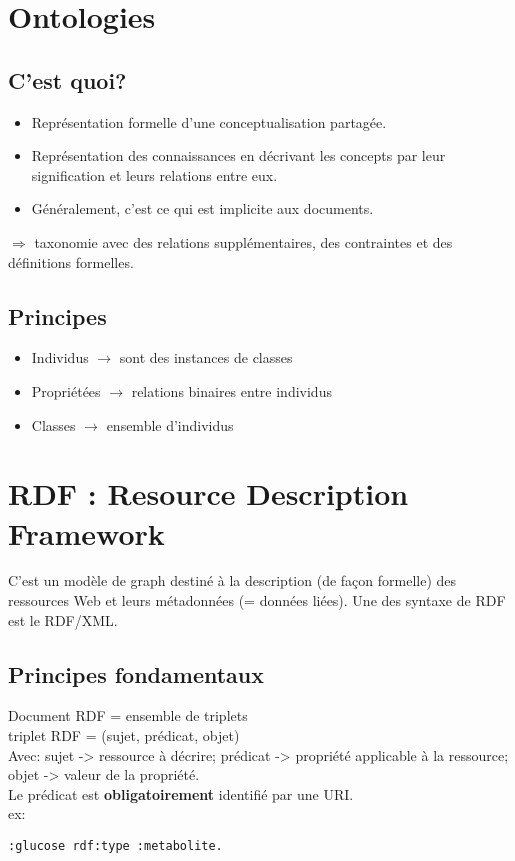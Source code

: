 \documentclass[11pt,a4paper]{article}
\begin{document}
\section{Ontologies}
\subsection{C'est quoi?}
\begin{itemize}
    \item Représentation formelle d'une conceptualisation partagée.
    \item Représentation des connaissances en décrivant les concepts par leur signification et leurs relations entre eux.
    \item Généralement, c'est ce qui est implicite aux documents.
\end{itemize}
$\Rightarrow$ taxonomie avec des relations supplémentaires, des contraintes et des définitions formelles.

\subsection{Principes}
\begin{itemize}
    \item Individus $\rightarrow$ sont des instances de classes
    \item Propriétées $\rightarrow$ relations binaires entre individus
    \item Classes $\rightarrow$ ensemble d'individus
\end{itemize}


\section{RDF : Resource Description Framework}
C'est un modèle de graph destiné à la description (de façon formelle) des ressources Web et leurs métadonnées (= données liées).
Une des syntaxe de RDF est le RDF/XML.

\subsection{Principes fondamentaux}
Document RDF = ensemble de triplets\\
triplet RDF = (sujet, prédicat, objet)\\
Avec: sujet -> ressource à décrire; prédicat -> propriété applicable à la ressource; objet -> valeur de la propriété.\\
Le prédicat est \textbf{obligatoirement} identifié par une URI.\\
ex:
\begin{lstlisting}
:glucose rdf:type :metabolite.
\end{lstlisting}
\end{document}
